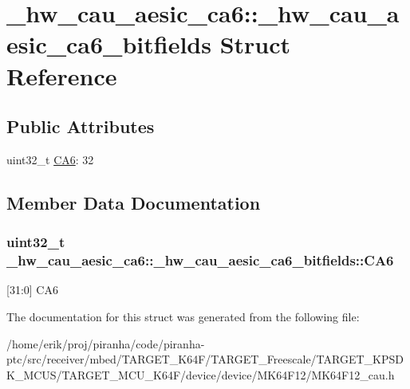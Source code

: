 \hypertarget{struct__hw__cau__aesic__ca6_1_1__hw__cau__aesic__ca6__bitfields}{}\section{\+\_\+hw\+\_\+cau\+\_\+aesic\+\_\+ca6\+:\+:\+\_\+hw\+\_\+cau\+\_\+aesic\+\_\+ca6\+\_\+bitfields Struct Reference}
\label{struct__hw__cau__aesic__ca6_1_1__hw__cau__aesic__ca6__bitfields}
\subsection*{Public Attributes}
\begin{DoxyCompactItemize}
\item 
uint32\+\_\+t \hyperlink{struct__hw__cau__aesic__ca6_1_1__hw__cau__aesic__ca6__bitfields_a781ef682ab75a3d4b87d5b575066b11d}{C\+A6}\+: 32
\end{DoxyCompactItemize}


\subsection{Member Data Documentation}
\subsubsection[{\texorpdfstring{C\+A6}{CA6}}]{\setlength{\rightskip}{0pt plus 5cm}uint32\+\_\+t \+\_\+hw\+\_\+cau\+\_\+aesic\+\_\+ca6\+::\+\_\+hw\+\_\+cau\+\_\+aesic\+\_\+ca6\+\_\+bitfields\+::\+C\+A6}\hypertarget{struct__hw__cau__aesic__ca6_1_1__hw__cau__aesic__ca6__bitfields_a781ef682ab75a3d4b87d5b575066b11d}{}\label{struct__hw__cau__aesic__ca6_1_1__hw__cau__aesic__ca6__bitfields_a781ef682ab75a3d4b87d5b575066b11d}
\mbox{[}31\+:0\mbox{]} C\+A6 

The documentation for this struct was generated from the following file\+:\begin{DoxyCompactItemize}
\item 
/home/erik/proj/piranha/code/piranha-\/ptc/src/receiver/mbed/\+T\+A\+R\+G\+E\+T\+\_\+\+K64\+F/\+T\+A\+R\+G\+E\+T\+\_\+\+Freescale/\+T\+A\+R\+G\+E\+T\+\_\+\+K\+P\+S\+D\+K\+\_\+\+M\+C\+U\+S/\+T\+A\+R\+G\+E\+T\+\_\+\+M\+C\+U\+\_\+\+K64\+F/device/device/\+M\+K64\+F12/M\+K64\+F12\+\_\+cau.\+h\end{DoxyCompactItemize}
